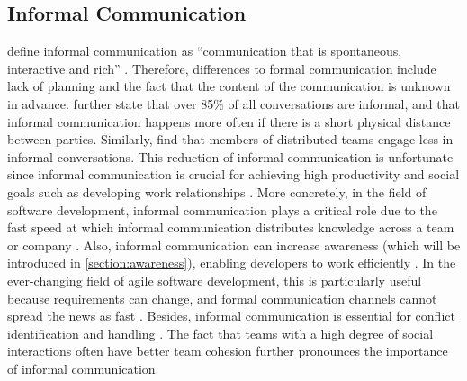 
\subsection{Informal Communication}
\citeauthor{kraut1990informal} define informal communication as \enquote{communication that is spontaneous, interactive and rich} \autocite[p.~5]{kraut1990informal}. Therefore, differences to formal communication include lack of planning and the fact that the content of the communication is unknown in advance. \textcite{kraut1990informal} further state that over 85\% of all conversations are informal, and that informal communication happens more often if there is a short physical distance between parties. Similarly, \textcite{hinds2005understanding} find that members of distributed teams engage less in informal conversations. This reduction of informal communication is unfortunate since informal communication is crucial for achieving high productivity and social goals \autocite{kraut1990informal} such as developing work relationships \autocite{comella2020revisiting, olson2006bridging}. More concretely, in the field of software development, informal communication plays a critical role due to the fast speed at which informal communication distributes knowledge across a team or company \autocite{french1998study, mockus2001challenges}. Also, informal communication can increase awareness (which will be introduced in \autoref{section:awareness}), enabling developers to work efficiently \autocite{herbsleb2001global}. In the ever-changing field of agile software development, this is particularly useful because requirements can change, and formal communication channels cannot spread the news as fast \autocite{french1998study, mockus2001challenges}. Besides, informal communication is essential for conflict identification and handling \autocite{hinds2005understanding}. The fact that teams with a high degree of social interactions often have better team cohesion \autocite{staehle2014management} further pronounces the importance of informal communication.

